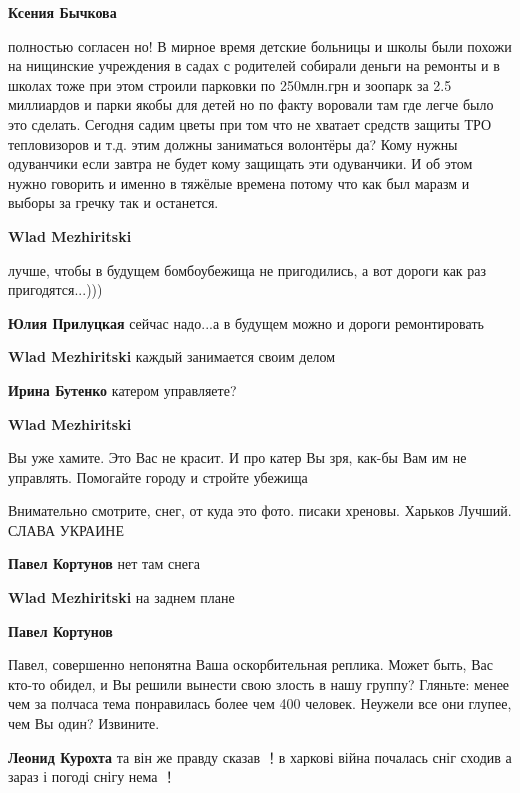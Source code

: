 \begin{itemize}
\begin{itemize}
\begin{itemize}
\textbf{Ксения Бычкова} 

полностью согласен но! В мирное время детские больницы и школы были похожи на
нищинские учреждения в садах с родителей собирали деньги на ремонты и в школах
тоже при этом строили парковки по 250млн.грн и зоопарк за 2.5 миллиардов и
парки якобы для детей но по факту воровали там где легче было это сделать.
Сегодня садим цветы при том что не хватает средств защиты ТРО тепловизоров и
т.д. этим должны заниматься волонтёры да? Кому нужны одуванчики если завтра не
будет кому защищать эти одуванчики. И об этом нужно говорить и именно в тяжёлые
времена потому что как был маразм и выборы за гречку так и останется.

\end{itemize} %

\textbf{Wlad Mezhiritski} 

лучше, чтобы в будущем бомбоубежища не пригодились, а вот дороги как раз пригодятся...)))

\textbf{Юлия Прилуцкая} сейчас надо...а в будущем можно и дороги ремонтировать

\textbf{Wlad Mezhiritski} каждый занимается своим делом

\textbf{Ирина Бутенко} катером управляете?

\textbf{Wlad Mezhiritski} 

Вы уже хамите. Это Вас не красит. И про катер Вы зря, как-бы Вам им не
управлять. Помогайте городу и стройте убежища

\end{itemize} %

Внимательно смотрите, снег, от куда это фото. писаки хреновы. Харьков Лучший.
СЛАВА УКРАИНЕ

\begin{itemize} %
\textbf{Павел Кортунов} нет там снега

\textbf{Wlad Mezhiritski} на заднем плане

\textbf{Павел Кортунов} 

Павел, совершенно непонятна Ваша оскорбительная реплика. Может быть, Вас кто-то
обидел, и Вы решили вынести свою злость в нашу группу? Гляньте: менее чем за
полчаса тема понравилась более чем 400 человек. Неужели все они глупее, чем Вы
один? Извините.

\begin{itemize} %
\textbf{Леонид Курохта} та він же правду сказав ！в харкові війна почалась сніг сходив а зараз і погоді снігу нема ！


\end{itemize}
\end{itemize}
\end{itemize}

